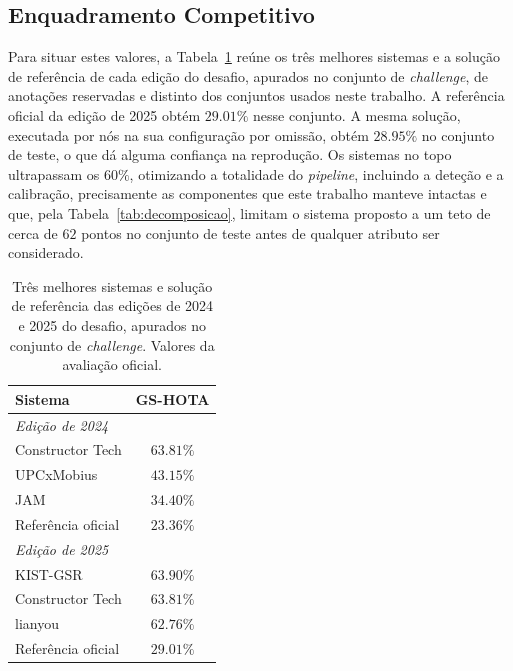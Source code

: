 \subsection{Enquadramento Competitivo}\label{sec:res_leaderboard}

Para situar estes valores, a Tabela~\ref{tab:leaderboard} reúne os três melhores sistemas e a solução de referência de cada edição do desafio, apurados no conjunto de \emph{challenge}, de anotações reservadas e distinto dos conjuntos usados neste trabalho. A referência oficial da edição de 2025 obtém $29.01\%$ nesse conjunto. A mesma solução, executada por nós na sua configuração por omissão, obtém $28.95\%$ no conjunto de teste, o que dá alguma confiança na reprodução. Os sistemas no topo ultrapassam os $60\%$, otimizando a totalidade do \emph{pipeline}, incluindo a deteção e a calibração, precisamente as componentes que este trabalho manteve intactas e que, pela Tabela~\ref{tab:decomposicao}, limitam o sistema proposto a um teto de cerca de $62$ pontos no conjunto de teste antes de qualquer atributo ser considerado.

\begin{table}[htbp]
    \centering
    \caption{Três melhores sistemas e solução de referência das edições de 2024 e 2025 do desafio, apurados no conjunto de \emph{challenge}. Valores da avaliação oficial.}
    \label{tab:leaderboard}
    \begin{tabular}{|l|c|}
        \hline
        \textbf{Sistema} & \textbf{GS-HOTA} \\
        \hline
        \multicolumn{2}{|l|}{\textit{Edição de 2024}} \\
        \hline
        Constructor Tech  & $63.81\%$ \\
        \hline
        UPCxMobius        & $43.15\%$ \\
        \hline
        JAM               & $34.40\%$ \\
        \hline
        Referência oficial & $23.36\%$ \\
        \hline
        \multicolumn{2}{|l|}{\textit{Edição de 2025}} \\
        \hline
        KIST-GSR          & $63.90\%$ \\
        \hline
        Constructor Tech  & $63.81\%$ \\
        \hline
        lianyou           & $62.76\%$ \\
        \hline
        Referência oficial & $29.01\%$ \\
        \hline
    \end{tabular}
\end{table}

